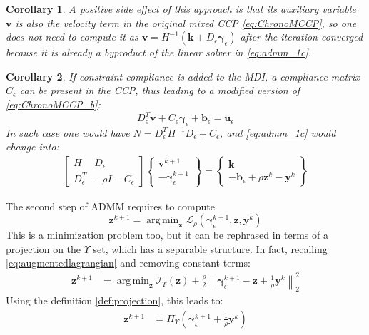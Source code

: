 \documentclass[final,3p]{elsarticle}
\newcommand{\vect}[1]{\bm{#1}}
\newcommand{\norm}[1]{\left\lVert#1\right\rVert}
\DeclareMathOperator*{\argmin}{arg\,min} %
\newtheorem{corollary}{Corollary}[theorem]
\begin{document}
\begin{corollary}
A positive side effect of this approach is that its auxiliary variable $\vect{v}$ is also the velocity term in the original mixed CCP 
\eqref{eq:ChronoMCCP}, so one does not need to compute it as $\vect{v}=H^{-1}(\vect{k} + D_\epsilon \vect{\gamma}_\epsilon )$ after the iteration converged because it is already a byproduct of the linear solver in \eqref{eq:admm_1c}.
\end{corollary}

\begin{corollary}
If constraint compliance is added to the MDI, a compliance matrix $C_\epsilon$ can be present in the CCP, thus leading to a modified version of \eqref{eq:ChronoMCCP_b}:
\[
D_{\epsilon}^T \vect{v}  +C_\epsilon \vect{\gamma}_\epsilon + \vect{b}_\epsilon = \vect{u}_\epsilon
\]
In such case one would have $N=D_{\epsilon}^T H^{-1} D_{\epsilon} + C_\epsilon$, and \eqref{eq:admm_1c} would change into: 
\begin{subequations}
	\begin{align}
    \begin{bmatrix}
		 H   & D_\epsilon \\
		 D_\epsilon^T & - \rho I - C_\epsilon
		\end{bmatrix}
		\begin{Bmatrix}
		 \vect{v}^{k+1}   \\
		 -\vect{\gamma}_\epsilon^{k+1} 
		\end{Bmatrix}
		=
		\begin{Bmatrix}
		 \vect{k} \\
		 -\vect{b}_\epsilon + \rho \vect{z}^k -\vect{y}^k 
		\end{Bmatrix}
	\end{align}
	\label{eq:admm_1c_compl}
\end{subequations}
\end{corollary}



The second step of ADMM requires to compute 
\[
\vect{z}^{k+1} = \argmin_{\vect{z}} 
\mathcal{L}_{\rho} \left(\vect{\gamma}_\epsilon^{k+1},\vect{z},\vect{y}^k\right)
\] 
%
This is a minimization problem too, but it can be rephrased in terms of a projection on the $\Upsilon$ set, which has a separable structure.
In fact, recalling \eqref{eq:augmentedlagrangian} and removing constant terms: 
\begin{align}
\vect{z}^{k+1} &= \argmin_{\vect{z}}  
\mathcal{I}_\Upsilon(\vect{z}) 
+ \frac{\rho}{2} \norm{ \vect{\gamma}_\epsilon^{k+1} - \vect{z} + \frac{1}{\rho} \vect{y}^k}_2^2
\end{align}
%
Using the definition \ref{def:projection}, this leads to:
\begin{align}
\vect{z}^{k+1} &= \Pi_\Upsilon \left(  \vect{\gamma}_\epsilon^{k+1} +\frac{1}{\rho} \vect{y}^k \right )
\end{align}
\end{document}
